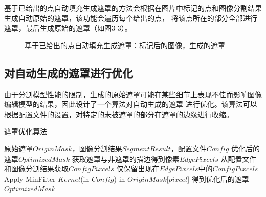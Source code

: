 \documentclass[a4paper,AutoFakeBold,oneside,12pt]{book}
\begin{document}
基于已给出的点自动填充生成遮罩的方法会根据在图片中标记的点和图像分割结果生成自动原始的遮罩，该功能会遍历每个给出的点，
将该点所在的部分全部进行遮罩，最后生成原始的遮罩（如图3-3）。
\begin{figure}[!htbp]
    \centering
    \quad %
    \caption{基于已给出的点自动填充生成遮罩：\protect{}标记后的图像，\protect{}生成的遮罩} %
    \label{Fig:Point} 
\end{figure}

\newpage
\subsection{对自动生成的遮罩进行优化}
由于分割模型性能的限制，生成的原始遮罩可能在某些细节上表现不佳而影响图像编辑模型的结果，因此设计了一个算法对自动生成的遮罩
进行优化。该算法可以根据配置文件的设置，对特定的未被遮罩的部分在遮罩的边缘进行收缩。

\begin{algorithm} 
	\begin{spacing}{1.3}
		\caption{遮罩优化算法} 
		\label{MaskOptimizationAlgorithm}
		\renewcommand{\algorithmicrequire}{\textbf{输入：}}
		\renewcommand{\algorithmicensure}{\textbf{输出：}} 
			\begin{algorithmic}[1] 
				\Require 原始遮罩$OriginMask$，图像分割结果$SegmentResult$，配置文件$Config$
				\Ensure 优化后的遮罩$OptimizedMask$
				\State 获取遮罩与非遮罩的描边得到像素$EdgePixcels$
				\State 从配置文件和图像分割结果获取$ConfigPixcels$
                \State 仅保留出现在$EdgePixcels$中的$ConfigPixcels$
                    \State Apply MinFilter $Kernel$(in $Config$) in $OriginMask$[$pixcel$]
                \EndFor
                \State 得到优化后的遮罩$OptimizedMask$
			\end{algorithmic}
	\end{spacing}
\end{algorithm}
\end{document}
